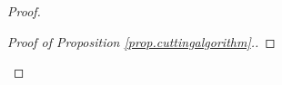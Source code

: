 \begin{proof}
\begin{proof}[Proof of Proposition \ref{prop.cuttingalgorithm}.]





\end{proof}
\end{proof}
